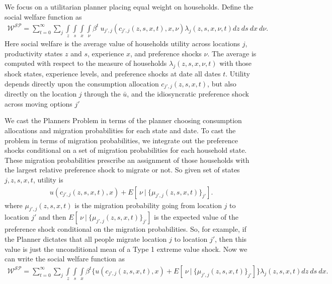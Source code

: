 \documentclass[12pt,pdftex]{article}
\begin{document}
\begin{onehalfspacing}
We focus on a utilitarian planner placing equal weight on households. Define the social welfare function as
\begin{align}
\mathcal{W^{SP}} = \sum_{t=0}^{\infty}\sum_{j} \int\limits_{z} \int\limits_{s} \int\limits_{x} \int\limits_{\nu} \beta^{t} \ u_{j',j}(c_{j',j}(z, s, x, t), x, \nu) \lambda_{j}(z, s, x, \nu, t) dz \ ds \ dx \ d\nu.
\label{eq:sp-social_welfare}
\end{align}
Here social welfare is the average value of households utility across locations $j$, productivity states $z$ and $s$, experience $x$, and preference shocks $\nu$. The average is computed with respect to the measure of households $\lambda_{j}(z, s, x, \nu, t)$ with those shock states, experience levels, and preference shocks at date all dates $t$. Utility depends directly upon the consumption allocation $c_{j',j}(z, s, x, t)$, but also  directly on the location $j$ through the $\bar u$, and the idiosyncratic preference shock across moving options $j'$

We cast the Planners Problem in terms of the planner choosing consumption allocations and migration probabilities for each state and date. To cast the problem in terms of migration probabilities, we integrate out the preference shocks conditional on a set of migration probabilities for each household state. These migration probabilities prescribe an assignment of those households with the largest relative preference shock to migrate or not. So given set of states $j, z, s, x, t$, utility is
\begin{align}
u(c_{j',j}(z,s, x, t), x) + E[ \ \nu \ | \ \big\{\mu_{j',j}(z,s,x,t)\big\}_{j'} ].
\label{eq:utility-shocks}
\end{align}
where $\mu_{j',j}(z,s,x,t)$ is the migration probability going from location $j$ to location $j'$ and then $E[ \ \nu \ | \ \big\{\mu_{j',j}(z,s,x,t)\big\}_{j'} ]$ is the expected value of the preference shock conditional on the migration probabilities. So, for example, if the Planner dictates that all people migrate location $j$ to location $j'$, then this value is just the unconditional mean of a Type 1 extreme value shock. Now we can write the social welfare function as
\begin{align}
\mathcal{W^{SP}} = \sum_{t=0}^{\infty}\sum_{j} \int\limits_{z} \int\limits_{s} \int\limits_{x} \beta^{t} \bigg \{ u(c_{j',j}(z, s, x, t), x) + E[ \ \nu \ | \ \big\{\mu_{j',j}(z, s,x,t)\big\}_{j'}] \bigg \} \lambda_{j}(z, s, x, t) dz \ ds \ dx.
\label{eq:sp-social_welfare2}
\end{align}


\end{onehalfspacing}
\end{document}
